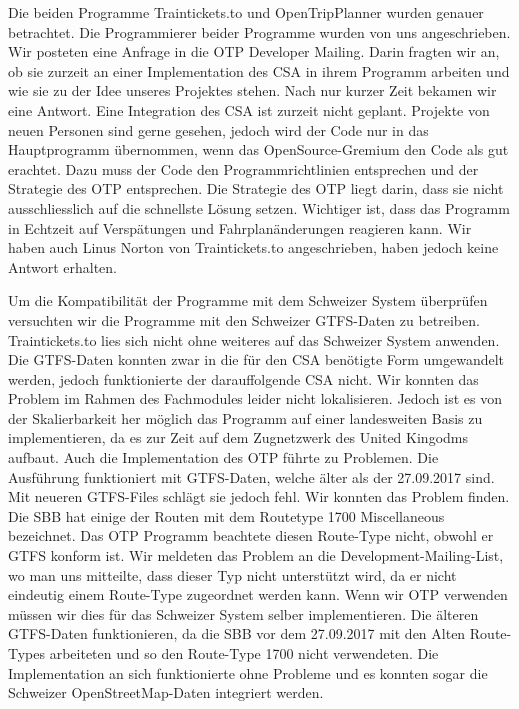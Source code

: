 Die beiden Programme Traintickets.to und OpenTripPlanner wurden genauer betrachtet. Die Programmierer beider Programme wurden von uns angeschrieben. Wir posteten eine Anfrage in die OTP Developer Mailing. Darin fragten wir an, ob sie zurzeit an einer Implementation des CSA in ihrem Programm arbeiten und wie sie zu der Idee unseres Projektes stehen. Nach nur kurzer Zeit bekamen wir eine Antwort. Eine Integration des CSA ist zurzeit nicht geplant. Projekte von neuen Personen sind gerne gesehen, jedoch wird der Code nur in das Hauptprogramm übernommen, wenn  das OpenSource-Gremium den Code als gut erachtet. Dazu muss der Code den Programmrichtlinien entsprechen und der Strategie des OTP entsprechen. Die Strategie des OTP liegt darin, dass sie nicht ausschliesslich auf die schnellste Lösung setzen. Wichtiger ist, dass das Programm in Echtzeit auf Verspätungen und Fahrplanänderungen reagieren kann. Wir haben auch Linus Norton von Traintickets.to angeschrieben, haben jedoch keine Antwort erhalten. 

Um die Kompatibilität der Programme mit dem Schweizer System überprüfen versuchten wir die Programme mit den Schweizer GTFS-Daten zu betreiben. Traintickets.to lies sich nicht ohne weiteres auf das Schweizer System anwenden. Die GTFS-Daten konnten zwar in die für den CSA benötigte Form umgewandelt werden, jedoch funktionierte der darauffolgende CSA nicht. Wir konnten das Problem im Rahmen des Fachmodules leider nicht lokalisieren. Jedoch ist es von der Skalierbarkeit her möglich das Programm auf einer landesweiten Basis zu implementieren, da es zur Zeit auf dem Zugnetzwerk des United Kingodms aufbaut. Auch die Implementation des OTP führte zu Problemen. Die Ausführung funktioniert mit GTFS-Daten, welche älter als der 27.09.2017 sind. Mit neueren GTFS-Files schlägt sie jedoch fehl. Wir konnten das Problem finden. Die SBB hat einige der Routen mit dem Routetype 1700 Miscellaneous bezeichnet. Das OTP Programm beachtete diesen Route-Type nicht, obwohl er GTFS konform ist. Wir meldeten das Problem an die Development-Mailing-List, wo man uns mitteilte, dass dieser Typ nicht unterstützt wird, da er nicht eindeutig einem Route-Type zugeordnet werden kann. Wenn wir OTP verwenden müssen wir dies für das Schweizer System selber implementieren. Die älteren GTFS-Daten funktionieren, da die SBB vor dem 27.09.2017 mit den Alten Route-Types arbeiteten und so den Route-Type 1700 nicht verwendeten. Die Implementation an sich funktionierte ohne Probleme und es konnten sogar die Schweizer OpenStreetMap-Daten integriert werden.

